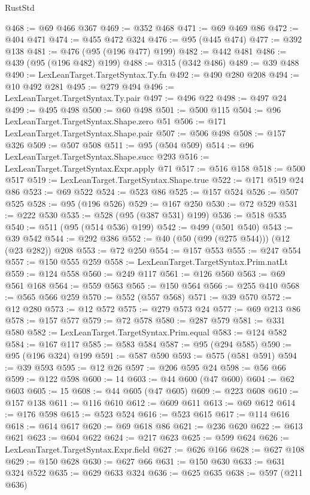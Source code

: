 \begin{lexlean}{RustStd}
\begin{coremodule}
@468 := @69 @466 @367
@469 := @352 @468
@471 := @69 @469 @86
@472 := @404 @471
@474 := @455 @472 @324
@476 := @95 (@445 @474)
@477 := @392 @138
@481 := @476 (@95 (@196 @477) @199)
@482 := @442 @481
@486 := @439 (@95 (@196 @482) @199)
@488 := @315 (@342 @486)
@489 := @39 @488
@490 := LexLeanTarget.TargetSyntax.Ty.fn
@492 := @490 @280 @208
@494 := @10 @492 @281
@495 := @279 @494
@496 := LexLeanTarget.TargetSyntax.Ty.pair
@497 := @496 @22
@498 := @497 @24
@499 := @495 @498
@500 := @60 @498
@501 := @500 @115
@504 := @96 LexLeanTarget.TargetSyntax.Shape.zero @51
@506 := @171 LexLeanTarget.TargetSyntax.Shape.pair
@507 := @506 @498
@508 := @157 @326
@509 := @507 @508
@511 := @95 (@504 @509)
@514 := @96 LexLeanTarget.TargetSyntax.Shape.succ @293
@516 := LexLeanTarget.TargetSyntax.Expr.apply @71
@517 := @516 @158
@518 := @500 @517
@519 := LexLeanTarget.TargetSyntax.Shape.true
@522 := @171 @519 @24 @86
@523 := @69 @522
@524 := @523 @86
@525 := @157 @524
@526 := @507 @525
@528 := @95 (@196 @526)
@529 := @167 @250
@530 := @72 @529
@531 := @222 @530
@535 := @528 (@95 (@387 @531) @199)
@536 := @518 @535
@540 := @511 (@95 (@514 @536) @199)
@542 := @499 (@501 @540)
@543 := @39 @542
@544 := @292 @386
@552 := @40 (@50 (@99 (@275 @544))) (@12 (@23 @282)) @208
@553 := @72 @250
@554 := @157 @553
@555 := @247 @554
@557 := @150 @555 @259
@558 := LexLeanTarget.TargetSyntax.Prim.natLt
@559 := @124 @558
@560 := @249 @117
@561 := @126 @560
@563 := @69 @561 @168
@564 := @559 @563
@565 := @150 @564
@566 := @255 @410
@568 := @565 @566 @259
@570 := @552 (@557 @568)
@571 := @39 @570
@572 := @12 @280
@573 := @12 @572
@575 := @279 @573 @24
@577 := @69 @213 @86
@578 := @157 @577
@579 := @72 @578
@580 := @287 @579
@581 := @331 @580
@582 := LexLeanTarget.TargetSyntax.Prim.equal
@583 := @124 @582
@584 := @167 @117
@585 := @583 @584
@587 := @95 (@294 @585)
@590 := @95 (@196 @324) @199
@591 := @587 @590
@593 := @575 (@581 @591)
@594 := @39 @593
@595 := @12 @26
@597 := @206 @595 @24
@598 := @56 @66
@599 := @122 @598
@600 := 14
@603 := @44 @600 (@47 @600)
@604 := @62 @603
@605 := 15
@608 := @44 @605 (@47 @605)
@609 := @223 @608
@610 := @157 @138
@611 := @116 @610
@612 := @609 @611
@613 := @69 @612
@614 := @176 @598
@615 := @523 @524
@616 := @523 @615
@617 := @114 @616
@618 := @614 @617
@620 := @69 @618 @86
@621 := @236 @620
@622 := @613 @621
@623 := @604 @622
@624 := @217 @623
@625 := @599 @624
@626 := LexLeanTarget.TargetSyntax.Expr.field
@627 := @626 @166
@628 := @627 @108
@629 := @150 @628
@630 := @627 @66
@631 := @150 @630
@633 := @631 @324 @522
@635 := @629 @633 @324
@636 := @625 @635
@638 := @597 (@211 @636)

\end{coremodule}
\end{lexlean}
